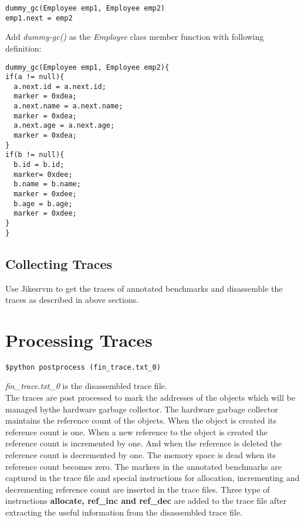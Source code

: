 \documentclass[a4paper]{article}
\begin{document}
\begin{itemize}
\begin{verbatim}
dummy_gc(Employee emp1, Employee emp2)
emp1.next = emp2
\end{verbatim}

Add \textit{dummy-gc()} as the \textit{Employee} class member function with following definition:
\begin{verbatim}
dummy_gc(Employee emp1, Employee emp2){
if(a != null){
  a.next.id = a.next.id;
  marker = 0xdea;
  a.next.name = a.next.name;
  marker = 0xdea;
  a.next.age = a.next.age;
  marker = 0xdea;
}
if(b != null){
  b.id = b.id;
  marker= 0xdee;
  b.name = b.name;
  marker = 0xdee;
  b.age = b.age;
  marker = 0xdee;
}
}
\end{verbatim}
\end{itemize}

\subsection{Collecting Traces}
Use Jikesrvm to get the traces of annotated benchmarks and disassemble the traces as described in above sections.

\section{Processing Traces}
\begin{verbatim}
$python postprocess (fin_trace.txt_0)
\end{verbatim}
\textit{fin\_trace.txt\_0} is the disassembled trace file.\\
The traces are post processed to mark the addresses of the objects which will be managed bythe hardware garbage collector. The hardware garbage collector maintains the reference count of the objects. When the object is created its reference count is one. When a new reference to the object is created the reference count is incremented by one. And when the reference is deleted the reference count is decremented by one. The memory space is dead when its reference count becomes zero. The markers in the annotated benchmarks are captured in the trace file and special instructions for allocation, incrementing and decrementing reference count are inserted in the trace files. Three type of instructions \textbf{allocate, ref\_inc and ref\_dec} are added to the trace file after extracting the useful information from the disassembled trace file.
\end{document}
